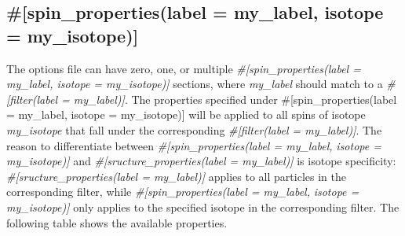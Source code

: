 \documentclass{book}
\begin{document}
\subsection{\#[spin\_properties(label = my\_label, isotope = my\_isotope)]}
The options file can have zero, one, or multiple 
\textit{\#[spin\_properties(label = my\_label, isotope = my\_isotope)]} 
sections, where \textit{my\_label} should match to a 
\textit{\#[filter(label = my\_label)]}.
The properties specified under  
{\#[spin\_properties(label = my\_label, isotope = my\_isotope)]} will be applied
to all spins of isotope \textit{my\_isotope} that fall under the corresponding
\textit{\#[filter(label = my\_label)]}.
The reason to differentiate between 
\textit{\#[spin\_properties(label = my\_label, }
\textit{isotope = my\_isotope)]}
and \textit{\#[sructure\_properties(label = my\_label)]}
is isotope specificity:
\textit{\#[sructure\_properties(label = my\_label)]} applies to all
particles in the corresponding filter, while 
\textit{\#[spin\_properties(label = my\_label, }
\textit{isotope = my\_isotope)]}
only applies to the specified isotope in the corresponding filter.
The following table shows the available properties.
\end{document}
